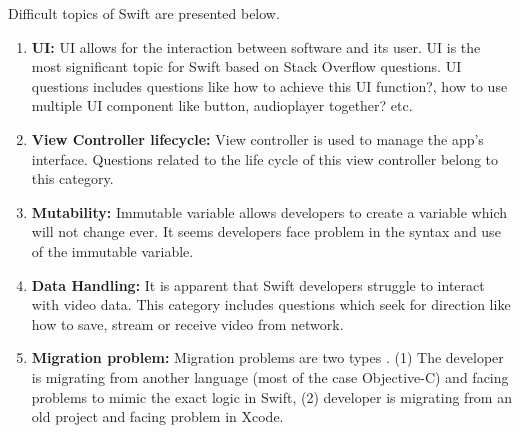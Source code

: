 Difficult topics of Swift are presented below.
\begin{enumerate}
\item \textbf{UI:} UI allows for the interaction between software and its user. UI is the most significant topic for Swift based on Stack Overflow questions. UI questions includes questions like how to achieve this UI function?, how to use multiple UI component like button, audioplayer together? etc.

\item\textbf{View Controller lifecycle:} View controller is used to manage the app's interface. Questions related to the life cycle of this view controller belong to this category.

\item \textbf{Mutability:} Immutable variable allows developers to create a variable which will not change ever. It seems developers face problem in the syntax and use of the immutable variable.

\item \textbf{Data Handling:} It is apparent that Swift developers struggle to interact with video data. This category includes questions which seek for direction like how to save, stream or receive video from network.

\item \textbf{Migration problem:} Migration problems are two types . (1) The developer is migrating from another language (most of the case Objective-C) and facing problems to mimic the exact logic in Swift, (2) developer is migrating from an old project and facing problem in Xcode. 

\end{enumerate}
